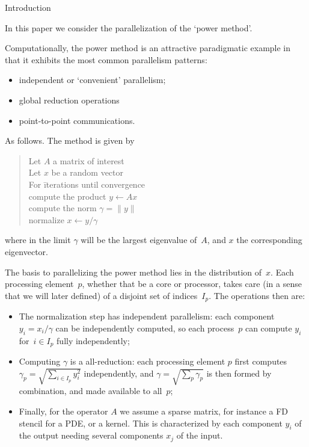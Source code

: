 
 {Introduction}

In this paper we consider the parallelization of the `power method'.

Computationally, the power method is an attractive paradigmatic example
in that it exhibits the most common parallelism patterns:
\begin{itemize}
\item independent or `convenient' parallelism;
\item global reduction operations
\item point-to-point communications.
\end{itemize}
As follows.
The method is given by
\begin{quote}
  \begin{tabbing}
    Let $A$ a matrix of interest\\
    Let $x$ be a random vector\\
    For \=iterations until convergence\\
    \> compute the product $y\leftarrow Ax$\\
    \> compute the norm $\gamma=\| y \|$\\
    \> normalize $x\leftarrow y/\gamma$\\
  \end{tabbing}
\end{quote}
where in the limit $\gamma$ will be the
largest eigenvalue of~$A$,
and $x$ the corresponding eigenvector.

The basis to parallelizing the power method lies in the distribution of~$x$.
Each processing element~$p$, whether that be a core or processor,
takes care (in a sense that we will later defined)
of a disjoint set of indices~$I_p$.
The operations then are:
\begin{itemize}
\item The normalization step has independent parallelism:
  each component $y_i=x_i/\gamma$ can be independently computed,
  so each process~$p$ can compute $y_i$ for~$i\in I_p$ fully independently;
\item Computing $\gamma$ is a all-reduction:
  each processing element $p$ first computes $\gamma_p=\sqrt{\sum_{i\in I_p}y_i^2}$
  independently,
  and $\gamma=\sqrt{\sum_p\gamma_p}$ is then formed by combination, and
  made available to all~$p$;
\item Finally, for the operator $A$ we assume a sparse matrix,
  for instance a \acf{FD} stencil for a \ac{PDE}, or a  kernel.
  This is characterized by each component $y_i$ of the output needing several
  components $x_j$ of the input.
\end{itemize}

